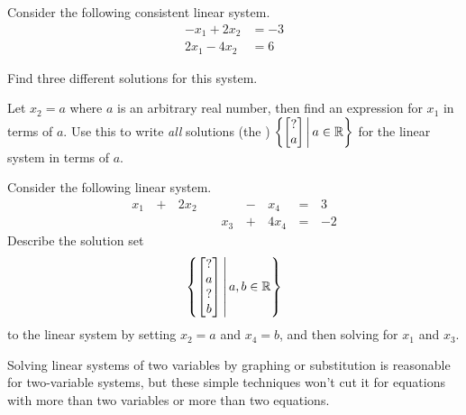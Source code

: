\begin{applicationActivities}{1}{3}
\begin{activity}{10}
  Consider the following consistent linear system.
  \begin{align*}
  -x_1+2x_2  &= -3 \\
  2x_1-4x_2  &=  6
  \end{align*}
\begin{subactivity}
  Find three different solutions
  for this system.
\end{subactivity}
\begin{subactivity}
  Let \(x_2=a\) where \(a\) is an arbitrary real number, then find an
  expression for \(x_1\) in terms of \(a\). Use this to write \textit{all}
  solutions (the )
  \(
    \left\{
	\begin{bmatrix}
      ? \\
      a
    \end{bmatrix} \,\middle|\, a \in \mathbb{R} 
	\right\}
  \)
  for the linear system in terms of \(a\).
\end{subactivity}
\end{activity}


\begin{activity}{10}
  Consider the following linear system.
  \begin{alignat*}{5}
    x_1 &\,+\,& 2x_2 &\, \,&     &\,-\,&  x_4 &\,=\,& 3 \\
        &\, \,&      &\, \,& x_3 &\,+\,& 4x_4 &\,=\,& -2
  \end{alignat*}
  Describe the solution set
  \[
  	\left\{
	\begin{bmatrix}
      ? \\
      a \\
      ? \\
      b
	\end{bmatrix} \,\middle|\, a,b \in \mathbb{R} \right\}
  \] 
  to the linear system
  by setting \(x_2=a\) and \(x_4=b\), and then solving for \(x_1\) and
  \(x_3\).
\end{activity}

\begin{observation}
  Solving linear systems of two variables by graphing or substitution is
  reasonable for two-variable systems, but these simple techniques
  won't cut it for equations with
  more than two variables or more than two equations.
\end{observation}


\end{applicationActivities}
